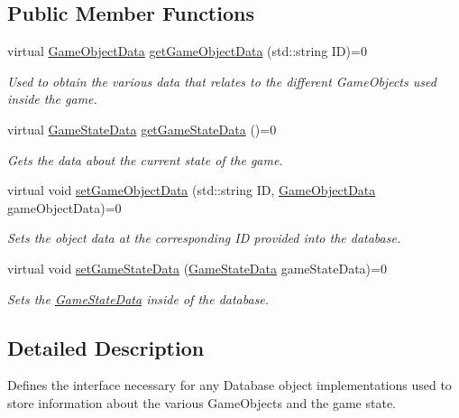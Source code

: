 \subsection*{Public Member Functions}
\begin{DoxyCompactItemize}
\item 
virtual \hyperlink{struct_game_object_data}{Game\+Object\+Data} \hyperlink{class_database_interface_a515afa17b15a4b111ebc1a43e1d0218e}{get\+Game\+Object\+Data} (std\+::string ID)=0
\begin{DoxyCompactList}\small\item\em Used to obtain the various data that relates to the different Game\+Objects used inside the game. \end{DoxyCompactList}\item 
virtual \hyperlink{struct_game_state_data}{Game\+State\+Data} \hyperlink{class_database_interface_a5972ccdce7669da4eef8ab82c69fe073}{get\+Game\+State\+Data} ()=0
\begin{DoxyCompactList}\small\item\em Gets the data about the current state of the game. \end{DoxyCompactList}\item 
virtual void \hyperlink{class_database_interface_ae1914371cb425f71ba750f57f968b491}{set\+Game\+Object\+Data} (std\+::string ID, \hyperlink{struct_game_object_data}{Game\+Object\+Data} game\+Object\+Data)=0
\begin{DoxyCompactList}\small\item\em Sets the object data at the corresponding ID provided into the database. \end{DoxyCompactList}\item 
virtual void \hyperlink{class_database_interface_a0b2f4402583b6ab31c70c713d72ceede}{set\+Game\+State\+Data} (\hyperlink{struct_game_state_data}{Game\+State\+Data} game\+State\+Data)=0
\begin{DoxyCompactList}\small\item\em Sets the \hyperlink{struct_game_state_data}{Game\+State\+Data} inside of the database. \end{DoxyCompactList}\end{DoxyCompactItemize}


\subsection{Detailed Description}
Defines the interface necessary for any Database object implementations used to store information about the various Game\+Objects and the game state. 


